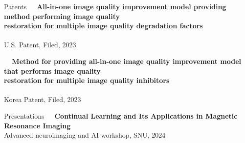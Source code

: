\documentclass{resume} %
\begin{document}
\begin{rSection}{Patents}
\textbullet~\,\, \textbf{All-in-one image quality improvement model providing method performing image quality \\\hspace*{1.4em}restoration for multiple image quality degradation factors}
\\ 
\\ \hspace*{1.5em}U.S. Patent, Filed, 2023


\textbullet~\,\, \textbf{Method for providing all-in-one image quality improvement model that performs image quality \\\hspace*{1.4em}restoration for multiple image quality inhibitors}
\\ 
\\ \hspace*{1.5em}Korea Patent, Filed, 2023 \\
\end{rSection}

\newpage


\begin{rSection}{Presentations}
\textbullet~\,\, \textbf{Continual Learning and Its Applications in Magnetic Resonance Imaging}
\\ \hspace*{1.5em}Advanced neuroimaging and AI workshop, SNU, 2024 \\
\end{rSection}






\end{document}
